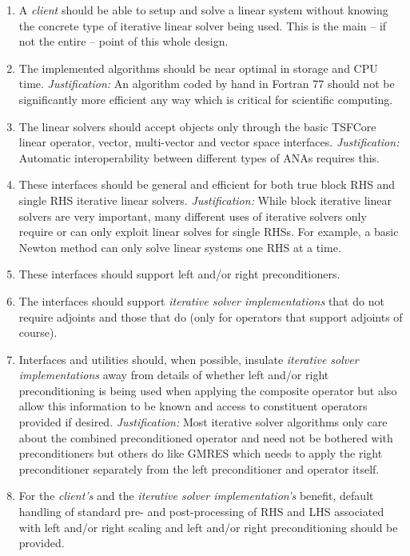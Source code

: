 \documentclass[pdf,ps2pdf,11pt]{SANDreport}
\begin{document}
\begin{enumerate}
\item
A {}\textit{client} should be able to setup and solve a linear system
without knowing the concrete type of iterative linear solver being
used.  This is the main -- if not the entire -- point of this whole
design.
\item
The implemented algorithms should be near optimal in storage and CPU
time.  {}\textit{Justification:} An algorithm coded by hand in Fortran
77 should not be significantly more efficient any way which is
critical for scientific computing.
\item
The linear solvers should accept objects only through the basic
TSFCore linear operator, vector, multi-vector and vector space
interfaces.  {}\textit{Justification:} Automatic interoperability
between different types of ANAs requires this.
\item
These interfaces should be general and efficient for both true block
RHS and single RHS iterative linear solvers.
{}\textit{Justification:} While block iterative linear solvers are
very important, many different uses of iterative solvers only require
or can only exploit linear solves for single RHSs.  For example, a
basic Newton method can only solve linear systems one RHS at a time.
\item
These interfaces should support left and/or right preconditioners.
\item
The interfaces should support {}\textit{iterative solver
implementations} that do not require adjoints and those that do (only
for operators that support adjoints of course).
\item
Interfaces and utilities should, when possible, insulate
{}\textit{iterative solver implementations} away from details of
whether left and/or right preconditioning is being used when applying
the composite operator but also allow this information to be known and
access to constituent operators provided if desired.
{}\textit{Justification:} Most iterative solver algorithms only care
about the combined preconditioned operator and need not be bothered
with preconditioners but others do like GMRES which needs to apply the
right preconditioner separately from the left preconditioner and
operator itself.
\item
For the {}\textit{client's} and the {}\textit{iterative solver
implementation's} benefit, default handling of standard pre- and
post-processing of RHS and LHS associated with left and/or right
scaling and left and/or right preconditioning should be provided.

\end{enumerate}
\end{document}
